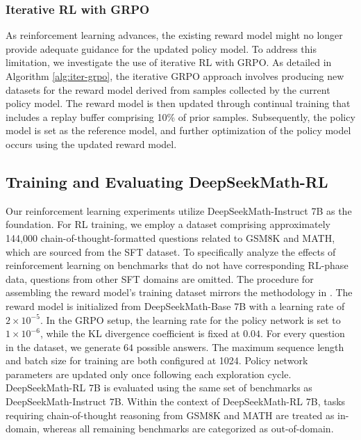 \begin{itemize}[topsep=0pt]
\begin{itemize}[topsep=0pt]
\subsubsection{Iterative RL with GRPO} As reinforcement learning advances, the existing reward model might no longer provide adequate guidance for the updated policy model. To address this limitation, we investigate the use of iterative RL with GRPO. As detailed in Algorithm \ref{alg:iter-grpo}, the iterative GRPO approach involves producing new datasets for the reward model derived from samples collected by the current policy model. The reward model is then updated through continual training that includes a replay buffer comprising 10\% of prior samples. Subsequently, the policy model is set as the reference model, and further optimization of the policy model occurs using the updated reward model.

\subsection{Training and Evaluating DeepSeekMath-RL}

Our reinforcement learning experiments utilize DeepSeekMath-Instruct 7B as the foundation. For RL training, we employ a dataset comprising approximately 144,000 chain-of-thought-formatted questions related to GSM8K and MATH, which are sourced from the SFT dataset. To specifically analyze the effects of reinforcement learning on benchmarks that do not have corresponding RL-phase data, questions from other SFT domains are omitted. The procedure for assembling the reward model’s training dataset mirrors the methodology in \citep{wang2023math}. The reward model is initialized from DeepSeekMath-Base 7B with a learning rate of $2 \times 10^{-5}$. In the GRPO setup, the learning rate for the policy network is set to $1 \times 10^{-6}$, while the KL divergence coefficient is fixed at $0.04$. For every question in the dataset, we generate $64$ possible answers. The maximum sequence length and batch size for training are both configured at 1024. Policy network parameters are updated only once following each exploration cycle. DeepSeekMath-RL 7B is evaluated using the same set of benchmarks as DeepSeekMath-Instruct 7B. Within the context of DeepSeekMath-RL 7B, tasks requiring chain-of-thought reasoning from GSM8K and MATH are treated as in-domain, whereas all remaining benchmarks are categorized as out-of-domain.


\end{itemize}
\end{itemize}
